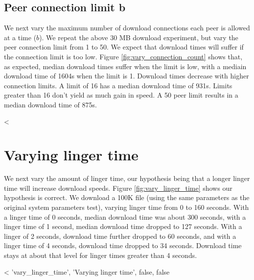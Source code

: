 \subsection{Peer connection limit b} 

We next vary the maximum number of download connections each peer is allowed at a time ($b$). We 
repeat the above 30 MB download experiment, but vary the peer connection limit from 1 to 50. 
We expect that download times will suffer if the connection limit is too low. Figure \ref{fig:vary_connection_count} shows that, as expected, median 
download times suffer when the limit is low, with a mediain download time of 1604s when the limit is 1.  Download 
times decrease with higher connection limits.  A limit of 16 has a median download time of 931s.  Limits greater than 16 don't
yield as much gain in speed. A 50 peer limit results in a median download time of 875s.

<%

\section{Varying linger time}

We next vary the amount of linger time, our hypothesis being that a longer linger 
time will increase download speeds.  Figure \ref{fig:vary_linger_time} shows our hypothesis is correct.   
We download a 100K file (using the same parameters as the original system parameters test), varying linger time from 0 to 160 seconds.
With a linger time of 0 seconds, median download time was about 300 seconds, with 
a linger time of 1 second, median download time dropped to 127 seconds.  With a linger of 2 seconds, download time further dropped to 60 seconds, and
with a linger time of 4 seconds, download time dropped to 34 seconds.  Download time stays at about that level for linger times greater than 4 seconds.

<%
 'vary_linger_time', 'Varying linger time', false, false %
